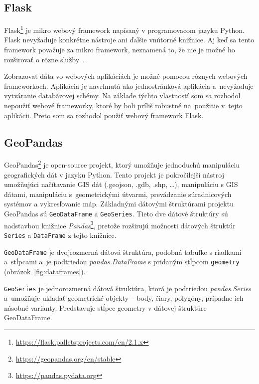 \subsection{Flask}
Flask\footnote{\url{https://flask.palletsprojects.com/en/2.1.x}} je mikro webový framework napísaný v programovacom jazyku Python. Flask nevyžaduje konkrétne nástroje ani ďalšie vnútorné knižnice. Aj keď sa tento framework považuje za mikro framework, neznamená to, že nie je možné ho rozširovať o rôzne služby~\cite{Oreilly2014Flask}.

Zobrazovať dáta vo webových aplikáciách je možné pomocou rôznych webových frameworkoch. Aplikácia je navrhnutá ako jednostránková aplikácia a~nevyžaduje vytváranie databázovej schémy. Na základe týchto vlastností som sa rozhodol nepoužiť webové frameworky, ktoré by boli príliš robustné na~použitie v~tejto aplikácii. Preto som sa rozhodol použiť webový framework Flask.

\subsection{GeoPandas}
GeoPandas\footnote{\url{https://geopandas.org/en/stable}} je open-source projekt, ktorý umožňuje jednoduchú manipuláciu geografických dát v jazyku Python. Tento projekt je pokročilejší nástroj umožňujúci načítavanie GIS dát (.geojson, .gdb, .shp, \ldots), manipuláciu s GIS dátami, manipuláciu s~geometrickými útvarmi, prevádzanie súradnicových systémov a vykresľovanie máp. Základnými dátovými štruktúrami projektu GeoPandas sú \texttt{GeoDataFrame} a \texttt{GeoSeries}. Tieto dve dátové štruktúry sú nadstavbou knižnice \emph{Pandas}\footnote{\url{https://pandas.pydata.org}}, pretože rozširujú možnosti dátových štruktúr \texttt{Series} a \texttt{DataFrame} z tejto knižnice.

\texttt{GeoDataFrame} je dvojrozmerná dátová štruktúra, podobná tabuľke s riadkami a~stĺpcami a~je podtriedou \emph{pandas.DataFrame} s pridaným stĺpcom \texttt{geometry} (obrázok~\ref{fig:dataframes}).

\texttt{GeoSeries} je jednorozmerná dátová štruktúra, ktorá je podtriedou \emph{pandas.Series} a~umožňuje ukladať geometrické objekty \--- body, čiary, polygóny, prípadne ich násobné varianty. Predstavuje stĺpec geometry v dátovej štruktúre GeoDataFrame.


